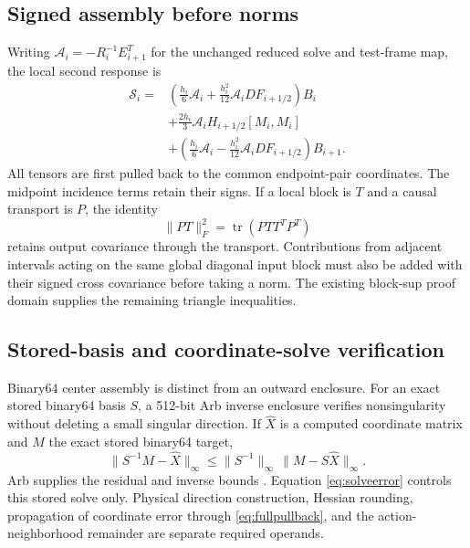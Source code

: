 \documentclass[11pt]{article}
\begin{document}
\subsection{Signed assembly before norms}
Writing \(\mathcal A_i=-R_i^{-1}E_{i+1}^T\) for the unchanged reduced solve
and test-frame map, the local second response is
\begin{align}
 \mathcal S_i={}&\left(\frac{h_i}{6}\mathcal A_i
              +\frac{h_i^2}{12}\mathcal A_iDF_{i+1/2}\right)B_i\nonumber\\
 &+\frac{2h_i}{3}\mathcal A_iH_{i+1/2}[M_i,M_i]\nonumber\\
 &+\left(\frac{h_i}{6}\mathcal A_i
              -\frac{h_i^2}{12}\mathcal A_iDF_{i+1/2}\right)B_{i+1}.
\end{align}
All tensors are first pulled back to the common endpoint-pair coordinates.
The midpoint incidence terms retain their signs. If a local block is \(T\)
and a causal transport is \(P\), the identity
\begin{equation}
 \|PT\|_F^2=\operatorname{tr}(P TT^T P^T)
\end{equation}
retains output covariance through the transport. Contributions from adjacent
intervals acting on the same global diagonal input block must also be added
with their signed cross covariance before taking a norm. The existing
block-sup proof domain supplies the remaining triangle inequalities.

\subsection{Stored-basis and coordinate-solve verification}
Binary64 center assembly is distinct from an outward enclosure. For an exact
stored binary64 basis \(S\), a 512-bit Arb inverse enclosure verifies
nonsingularity without deleting a small singular direction. If \(\widehat X\)
is a computed coordinate matrix and \(M\) the exact stored binary64 target,
\begin{equation}\label{eq:solveerror}
 \|S^{-1}M-\widehat X\|_\infty
 \leq \|S^{-1}\|_\infty\,\|M-S\widehat X\|_\infty.
\end{equation}
Arb supplies the residual and inverse bounds \cite{arb,solve}. Equation
\eqref{eq:solveerror} controls this stored solve only. Physical direction
construction, Hessian rounding, propagation of coordinate error through
\eqref{eq:fullpullback}, and the action-neighborhood remainder are separate
required operands.
\end{document}
